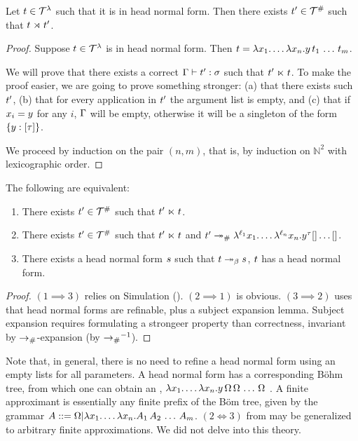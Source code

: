\begin{lemma}
Let $t \in \mathcal{T}^{\lambda}$ such that it is in head normal form.
 Then there exists $t' \in \mathcal{T}^{\mathtt{\#}}$ such that $t \mathrel{\rtimes} t'$.
\end{lemma}
\begin{proof}
Suppose $t \in \mathcal{T}^{\lambda}$ is in head normal form.
Then $t = \lambda x_1. \hdots\lambda x_n. y\,t_1\,\hdots\,t_m$.

We will prove that there exists a correct $\Gamma \vdash t' : \sigma$ such that $t' \mathrel{\ltimes} t$.
To make the proof easier, we are going to prove something stronger:
  (a) that there exists such $t'$,
  (b) that for every application in $t'$ the argument list is empty, and
  (c) that if $x_i = y$ for any $i$, $\Gamma$ will be empty,
      otherwise it will be a singleton of the form $\{y : [\tau]\}$.

We proceed by induction on the pair $(n, m)$, that is, by induction on
  $\mathbb{N}^2$ with lexicographic order.
\end{proof}

\begin{proposition}
The following are equivalent:
\begin{enumerate}
  \item There exists $t' \in \mathcal{T}^{\mathtt{\#}}$ such that $t' \mathrel{\ltimes} t$.
  \item There exists $t' \in \mathcal{T}^{\mathtt{\#}}$ such that $t' \mathrel{\ltimes} t$
    and $t' \mathrel{\mathrel{\twoheadrightarrow}_{\mathtt{\#}}}
         \lambda^{\ell_1} x_1. \hdots \lambda^{\ell_n} x_n. y^\tau{[] \hdots []}$.
  \item There exists a head normal form $s$ such that $t \mathrel{\twoheadrightarrow}_\beta s$, \ie
    $t$ has a head normal form.
\end{enumerate}
\end{proposition}
\begin{proof}
$(1 \implies 3)$ relies on Simulation ().
$(2 \implies 1)$ is obvious.
$(3 \implies 2)$ uses that head normal forms are refinable, plus a subject expansion lemma.
Subject expansion requires formulating a strongeer property than correctness,
invariant by $\mathrel{\to_{\mathtt{\#}}}$-expansion (\ie by $\mathrel{\to_{\mathtt{\#}}}^{-1}$).
\end{proof}


Note that, in general, there is no need to refine a head normal form using an empty lists for
all parameters.
A head normal form has a corresponding B\"ohm tree, from which one
can obtain an ,
$\lambda x_1. \hdots\lambda x_n. y\,\Omega\,\Omega\,\hdots\,\Omega$
\cite{Barendregt:1984,dezani-ciancaglini-bohm-approximant}.
A finite approximant is essentially any finite prefix of the B\"om tree, given by the grammar
$A ::= \Omega |\lambda x_1. \hdots\lambda x_n. A_1\,A_2\,\hdots\,A_m$.
$(2 \iff 3)$ from  may be generalized to arbitrary
finite approximations. We did not delve into this theory.



